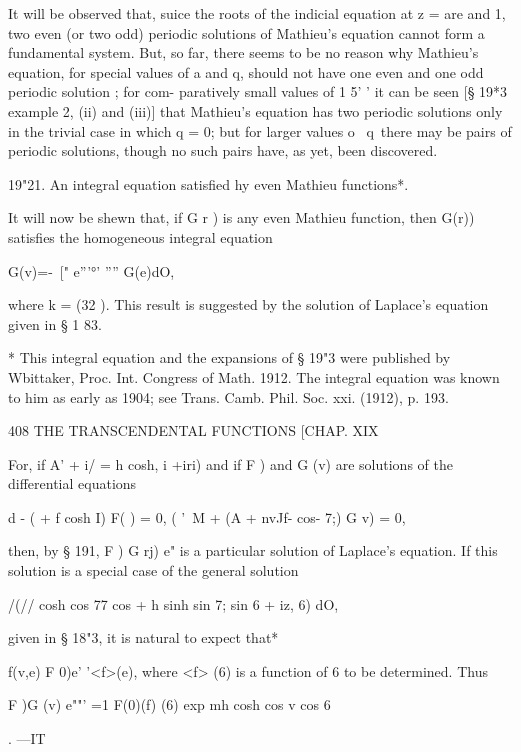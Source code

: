 It will be observed that, suice the roots of the indicial equation at z = are and 1, 
two even (or two odd) periodic solutions of Mathieu's equation cannot form a fundamental 
system. But, so far, there seems to be no reason why Mathieu's equation, for special 
values of a and q, should not have one even and one odd periodic solution ; for com- 
paratively small values of 1 5' ' it can be seen [§ 19*3 example 2, (ii) and (iii)] that Mathieu's 
equation has two periodic solutions only in the trivial case in which q = 0; but for larger 
values o  \ q\ there may be pairs of periodic solutions, though no such pairs have, as 
yet, been discovered. 

19"21. An integral equation satisfied hy even Mathieu functions*. 

It will now be shewn that, if G  r ) is any even Mathieu function, then 
G(r)) satisfies the homogeneous integral equation 



G(v)=-\ [" e'''°' '''' G(e)dO, 



where k = \/(32 ). This result is suggested by the solution of Laplace's 
equation given in § 1 83. 

* This integral equation and the expansions of § 19"3 were published by Wbittaker, Proc. 
Int. Congress of Math. 1912. The integral equation was known to him as early as 1904; see 
Trans. Camb. Phil. Soc. xxi. (1912), p. 193. 



408 THE TRANSCENDENTAL FUNCTIONS [CHAP. XIX 

For, if A' +  i/ = h cosh, i +iri) and if F  ) and G (v) are solutions of the 
differential equations 

 d  - (  +   f  cosh  I) F( ) = 0, 
( '\  M + (A + nvJf- cos- 7;) G  v) = 0, 

then, by § 191, F   ) G  rj) e"   is a particular solution of Laplace's equation. 
If this solution is a special case of the general solution 

/(// cosh   cos 77 cos   + h sinh   sin 7; sin 6 + iz, 6) dO, 

given in § 18"3, it is natural to expect that* 

f(v,e) F 0)e' '<f>(e), 
where <f> (6) is a function of 6 to be determined. Thus 



F  )G (v) e""' =1 F(0)(f) (6) exp  mh cosh   cos v cos 6 

. —IT 


